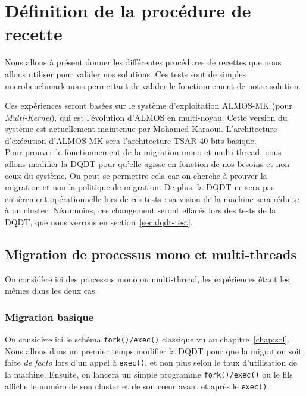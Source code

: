 \chapter{Définition de la procédure de recette}
\label{chap:tests}

  Nous allons à présent donner les différentes procédures de recettes que nous
  allons utiliser pour valider nos solutions. Ces tests sont de simples
  microbenchmark nous permettant de valider le fonctionnement de notre solution.

  Ces expériences seront basées sur le système d'exploitation ALMOS-MK (pour
  \textit{Multi-Kernel}), qui est l'évolution d'ALMOS en multi-noyau. Cette
  version du système est actuellement maintenue par Mohamed
  Karaoui. L'architecture d'exécution d'ALMOS-MK sera l'architecture TSAR 40
  bits basique.\\

  Pour prouver le fonctionnement de la migration mono et multi-thread, nous
  allons modifier la DQDT pour qu'elle agisse en fonction de nos besoins et non
  ceux du système. On peut se permettre cela car on cherche à prouver la
  migration et non la politique de migration. De plus, la DQDT ne sera pas
  entièrement opérationnelle lors de ces tests : sa vision de la machine sera
  réduite à un cluster. Néanmoins, ces changement seront effacés lors des tests
  de la DQDT, que nous verrons en section~\ref{sec:dqdt-test}.

  \section{Migration de processus mono et multi-threads}

    On considère ici des processus mono ou multi-thread, les expériences étant
    les mêmes dans les deux cas.

    \subsection{Migration basique}

      On considère ici le schéma \texttt{fork()/exec()} classique vu au
      chapitre~\ref{chap:sol}. Nous allons dans un premier temps modifier la
      DQDT pour que la migration soit faite \textit{de facto} lors d'un appel à
      \texttt{exec()}, et non plus selon le taux d'utilisation de la
      machine. Ensuite, on lancera un simple programme \texttt{fork()/exec()} où
      le fils affiche le numéro de son cluster et de son c\oe ur avant et après
      le \texttt{exec()}.

